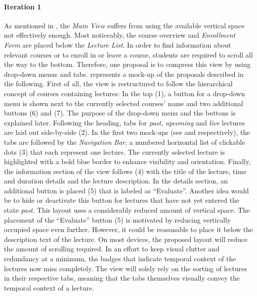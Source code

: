 \paragraph{Iteration 1}
As mentioned in , the \emph{Main View} suffers from using the available vertical space not effectively enough. Most noticeably, the course overview and \emph{Enrollment Form} are placed below the \emph{Lecture List}. In order to find information about relevant courses or to enroll in or leave a course, students are required to scroll all the way to the bottom. 
Therefore, one proposal is to compress this view by using drop-down menus and tabs.   represents a mock-up of the proposals described in the following. 
\newline
\newline
First of all, the view is restructured to follow the hierarchical concept of courses containing lectures: In the top (1), a button for a drop-down menu is shown next to the currently selected courses' name and two additional buttons (6) and (7). The purpose of the drop-down menu and the buttons is explained later.
Following the heading, tabs for \emph{past}, \emph{upcoming} and \emph{live} lectures are laid out side-by-side (2). In the first two mock-ups (see  and  respectively), the tabs are followed by the \emph{Navigation Bar}, a numbered horizontal list of clickable dots (3) that each represent one lecture. The currently selected lecture is highlighted with a bold blue border to enhance visibility and orientation. Finally, the information section of the view follows (4) with the title of the lecture, time and duration details and the lecture description. In the details section, an additional button is placed (5) that is labeled as “Evaluate”. Another idea would be to hide or deactivate this button for lectures that have not yet entered the state \emph{past}.
This layout uses a considerably reduced amount of vertical space. The placement of the “Evaluate” button (5) is motivated by reducing vertically occupied space even further. However, it could be reasonable to place it below the description text of the lecture. On most devices, the proposed layout will reduce the amount of scrolling required. In an effort to keep visual clutter and redundancy at a minimum, the badges that indicate temporal context of the lectures now miss completely.
The view will solely rely on the sorting of lectures in their respective tabs, meaning that the tabs themselves visually convey the temporal context of a lecture.
